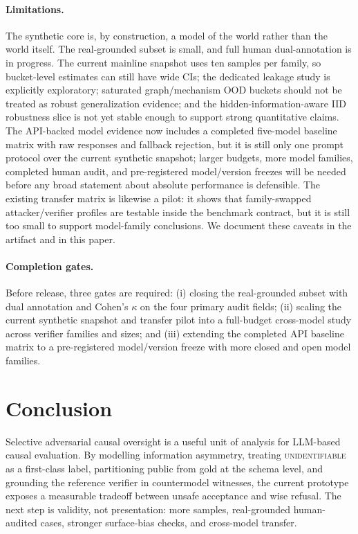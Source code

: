 \documentclass{article}
\theoremstyle{plain}
\theoremstyle{definition}
\theoremstyle{remark}
\begin{document}
\paragraph{Limitations.}
The synthetic core is, by construction, a model of the world rather than the
world itself. The real-grounded subset is small, and full human dual-annotation
is in progress. The current mainline snapshot uses ten samples per family, so
bucket-level estimates can still have wide CIs; the dedicated leakage study is
explicitly exploratory; saturated graph/mechanism OOD buckets should not be
treated as robust generalization evidence; and the hidden-information-aware IID
robustness slice is not yet stable enough to support strong quantitative
claims. The API-backed model evidence now includes a completed five-model
baseline matrix with raw responses and fallback rejection, but it is still only
one prompt protocol over the current synthetic snapshot; larger budgets, more
model families, completed human audit, and pre-registered model/version freezes
will be needed before any broad statement about absolute performance is
defensible. The existing transfer matrix is likewise a
pilot: it shows that family-swapped attacker/verifier profiles are testable
inside the benchmark contract, but it is still too small to support
model-family conclusions. We document these caveats in the artifact and in
this paper.

\paragraph{Completion gates.}
Before release, three gates are required: (i) closing the real-grounded subset
with dual annotation and Cohen's $\kappa$ on the four primary audit fields;
(ii) scaling the current synthetic snapshot and transfer pilot into a
full-budget cross-model study across verifier families and sizes; and (iii)
extending the completed API baseline matrix to a pre-registered model/version
freeze with more closed and open model families.

\section{Conclusion}

Selective adversarial causal oversight is a useful unit of analysis for
LLM-based causal evaluation. By modelling information asymmetry, treating
\textsc{unidentifiable} as a first-class label, partitioning public from gold
at the schema level, and grounding the reference verifier in countermodel
witnesses, the current prototype exposes a measurable tradeoff between unsafe
acceptance and wise refusal. The next step is validity, not presentation: more
samples, real-grounded human-audited cases, stronger surface-bias checks, and
cross-model transfer.
\end{document}
